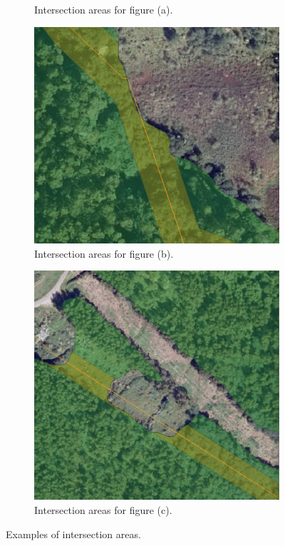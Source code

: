 \begin{figure}[H]
\begin{subfigure}{0.31\textwidth}
\caption{Intersection areas for figure (a).}
\label{fig:right}
\end{subfigure}
\begin{subfigure}{0.33\textwidth}
\centering
\includegraphics[width = \textwidth]{IMAGENES/Intersection2-m.png}
\caption{Intersection areas for figure (b).}
\label{fig:right}
\end{subfigure}
\begin{subfigure}{0.31\textwidth}
\centering
\includegraphics[width = \textwidth]{IMAGENES/Intersection3-m.png}
\caption{Intersection areas for figure (c).}
\label{fig:left}
\end{subfigure}
\caption{Examples of intersection areas. }
\label{fig:combined}
\end{figure}

